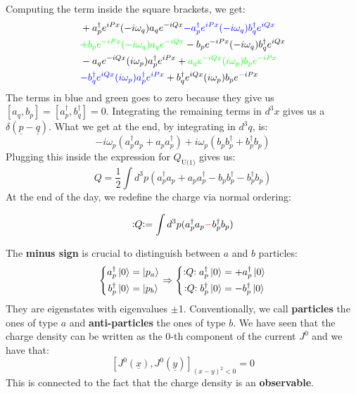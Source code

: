 \documentclass[../main.tex]{subfiles}
\begin{document}
Computing the term inside the square brackets, we get:
\begin{align*}
&+a^\dagger_pe^{iPx}(-i\omega_q)a_qe^{-iQx}{\color{blue}-a^\dagger_pe^{iPx}(-i\omega_q)b^\dagger_qe^{iQx}}\\
&{\color{green}+b_pe^{-iPx}(-i\omega_q)a_qe^{-iQx}}-b_pe^{-iPx}(-i\omega_q)b^\dagger_qe^{iQx}\\
&-a_qe^{-iQx}(i\omega_p)a^\dagger_pe^{iPx}+{\color{green}a_qe^{-iQx}(i\omega_p)b_pe^{-iPx}}\\
&{\color{blue}-b^\dagger_qe^{iQx}(i\omega_p)a^\dagger_pe^{iPx}}+b^\dagger_qe^{iQx}(i\omega_p)b_pe^{-iPx}
\end{align*}
The terms in blue and green goes to zero because they give us $[a_q,b_p]=[a^\dagger_p,b^\dagger_q]=0$. Integrating the remaining terms in $d^3x$ gives us a $\delta(\underline{p}-\underline{q})$. What we get at the end, by integrating in $d^3q$, is:
\[
-i\omega_p(a^\dagger_pa_p+a_pa^\dagger_p)+i\omega_p(b_pb^\dagger_p+b^\dagger_pb_p)
\]
Plugging this inside the expression for $Q_{\text{U(1)}}$ gives us:
\[
Q=\frac{1}{2}\int d^3p(a^\dagger_pa_p+a_pa^\dagger_p-b_pb^\dagger_p-b^\dagger_pb_p)
\]
At the end of the day, we redefine the charge via normal ordering:
\begin{kaobox}[frametitle=Normal ordered charge]
\[
\vcentcolon\mathrel{Q}\vcentcolon=\int d^3p(a^\dagger_pa_p{\color{red}-}b^\dagger_pb_p)
\]
\end{kaobox}
The \textbf{minus sign} is crucial to distinguish between $a$ and $b$ particles:
\[
\left\{
\begin{aligned}
a^\dagger_p\ket{0}&=\ket{p_a}\\
b^\dagger_p\ket{0}&=\ket{p_b}
\end{aligned}
\right.
\Rightarrow
\left\{
\begin{aligned}
\vcentcolon\mathrel{Q}\vcentcolon a^\dagger_p\ket{0}&=+a^\dagger_p\ket{0}\\
\vcentcolon\mathrel{Q}\vcentcolon b^\dagger_p\ket{0}&=-b^\dagger_p\ket{0}
\end{aligned}
\right.
\]
They are eigenstates with eigenvalues $\pm$1. Conventionally, we call \textbf{particles} the ones of type $a$ and \textbf{anti-particles} the ones of type $b$. We have seen that the charge density can be written as the 0-th component of the current $J^0$ and we have that:
\[
[J^0(\underline{x}),J^0(\underline{y})]_{(x-y)^2<0}=0
\]
This is connected to the fact that the charge density is an \textbf{observable}.
\end{document}
